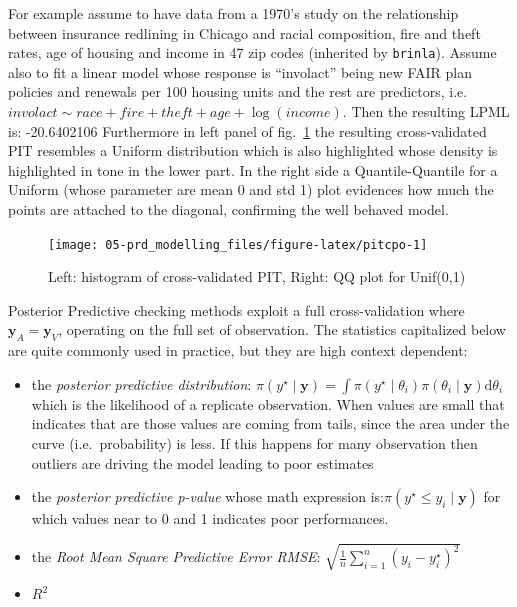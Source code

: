 \documentclass[
  12pt,
  a4paper,
  oneside]{book}
\newcommand{\passthrough}[1]{#1}
\providecommand{\tightlist}{%
  \setlength{\itemsep}{0pt}\setlength{\parskip}{0pt}}
\theoremstyle{definition}
\theoremstyle{definition}
\theoremstyle{definition}
\theoremstyle{remark}
\begin{document}
For example assume to have data from a 1970's study on the relationship between insurance redlining in Chicago and racial composition, fire and theft rates, age of housing and income in 47 zip codes (inherited by \passthrough{\lstinline!brinla!}\citep{brinla}). Assume also to fit a linear model whose response is ``involact'' being new FAIR plan policies and renewals per 100 housing units and the rest are predictors, i.e.~\(involact \sim race + fire +theft + age + \log(income)\).
Then the resulting LPML is: -20.6402106
Furthermore in left panel of fig.~\ref{fig:pitcpo} the resulting cross-validated PIT resembles a Uniform distribution which is also highlighted whose density is highlighted in tone in the lower part. In the right side a Quantile-Quantile for a Uniform (whose parameter are mean 0 and std 1) plot evidences how much the points are attached to the diagonal, confirming the well behaved model.

\begin{figure}

{\centering \texttt{[image: 05-prd\_modelling\_files/figure-latex/pitcpo-1]} 

}

\caption{Left: histogram of cross-validated PIT, Right: QQ plot for Unif(0,1)}\label{fig:pitcpo}
\end{figure}

Posterior Predictive checking methods \citep{gelman1996posterior} exploit a full cross-validation where \(\boldsymbol{y}_{A} = \boldsymbol{y}_{V}\), operating on the full set of observation. The statistics capitalized below are quite commonly used in practice, but they are high context dependent:

\begin{itemize}
\tightlist
\item
  the \emph{posterior predictive distribution}: \(\pi(y^{\star} \mid \boldsymbol{y}) = \int \pi(y^{\star} \mid \theta_{i})\pi({\theta_{i}} \mid \boldsymbol{y})\mathrm{d}\theta_{i}\) which is the likelihood of a replicate observation. When values are small that indicates that are those values are coming from tails, since the area under the curve (i.e.~probability) is less. If this happens for many observation then outliers are driving the model leading to poor estimates
\item
  the \emph{posterior predictive p-value} whose math expression is:\(\pi(y^{\star} \leq y_{i} \mid \boldsymbol{y})\) for which values near to 0 and 1 indicates poor performances.
\item
  the \emph{Root Mean Square Predictive Error RMSE}: \(\sqrt{\frac{1}{n} \sum_{i=1}^{n}(y_{i}-{y}^{\star}_{i})^{2}}\)
\item
  \(R^2\)
\end{itemize}
\end{document}
